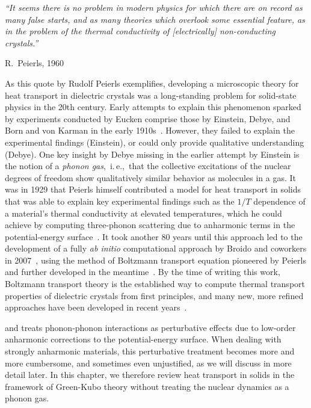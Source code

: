 \label{chp:heat_transport}
\epigraph{\singlespacing \it ``It seems there is no problem in modern physics for which there are on record as many false starts, and as many theories which overlook some essential feature, as in the problem of the thermal conductivity of [electrically] non-conducting crystals.''}{R.~Peierls, 1960~\cite{Peierls1960}}

As this quote by Rudolf Peierls exemplifies, developing a microscopic theory for heat transport in dielectric crystals was a long-standing problem for solid-state physics in the 20th century. Early attempts to explain this phenomenon sparked by experiments conducted by Eucken comprise those by Einstein, Debye, and Born and von Karman in the early 1910s~\cite{Eucken.1911,Einstein.1911,Debye.1912,Cahill.1988}. However, they failed to explain the experimental findings (Einstein), or could only provide qualitative understanding (Debye). One key insight by Debye missing in the earlier attempt by Einstein is the notion of a \emph{phonon gas},~i.\,e.,~that the collective excitations of the nuclear degrees of freedom show qualitatively similar behavior as molecules in a gas. It was in 1929 that Peierls himself contributed a model for heat transport in solids that was able to explain key experimental findings such as the $1/T$ dependence of a material's thermal conductivity at elevated temperatures, which he could achieve by computing three-phonon scattering due to anharmonic terms in the potential-energy surface~\cite{Peierls1929}. It took another 80 years until this approach led to the development of a fully \emph{ab initio} computational approach by Broido and coworkers in 2007~\cite{Broido2007}, using the method of Boltzmann transport equation pioneered by Peierls and further developed in the meantime~\cite{Omini.1996,Omini.1997,Broido.2005}. By the time of writing this work, Boltzmann transport theory is the established way to compute thermal transport properties of dielectric crystals from first principles, and many new, more refined approaches have been developed in recent years~\cite{Feng2016,Xia2018,Ravichandran2018,Simoncelli2019}.

 and treats phonon-phonon interactions as perturbative effects due to low-order anharmonic corrections to the potential-energy surface. When dealing with strongly anharmonic materials, this perturbative treatment becomes more and more cumbersome, and sometimes even unjustified, as we will discuss in more detail later. In this chapter, we therefore review heat transport in solids in the framework of Green-Kubo theory without treating the nuclear dynamics as a phonon gas.

